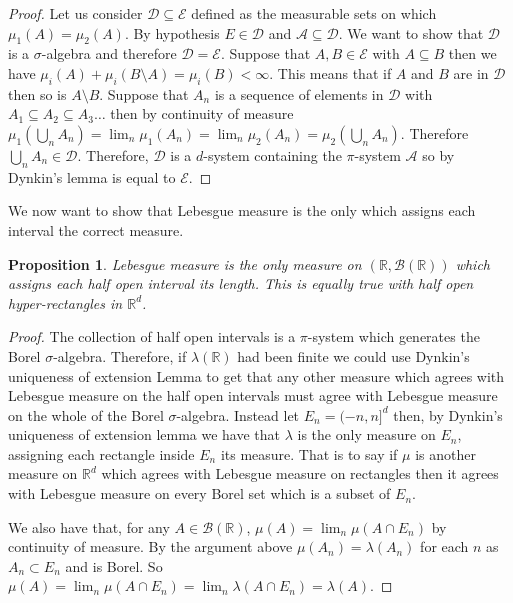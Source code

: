 \documentclass[
]{book}
\newtheorem{proposition}{Proposition}[chapter]
\theoremstyle{definition}
\theoremstyle{definition}
\theoremstyle{definition}
\theoremstyle{definition}
\theoremstyle{remark}
\begin{document}
\begin{proof}
Let us consider \(\mathcal{D} \subseteq \mathcal{E}\) defined as the measurable sets on which \(\mu_1(A) = \mu_2(A)\). By hypothesis \(E \in \mathcal{D}\) and \(\mathcal{A} \subseteq \mathcal{D}\). We want to show that \(\mathcal{D}\) is a \(\sigma\)-algebra and therefore \(\mathcal{D} = \mathcal{E}\). Suppose that \(A, B \in \mathcal{E}\) with \(A \subseteq B\) then we have \(\mu_i(A) + \mu_i (B \setminus A) = \mu_i(B) < \infty.\) This means that if \(A\) and \(B\) are in \(\mathcal{D}\) then so is \(A \setminus B\). Suppose that \(A_n\) is a sequence of elements in \(\mathcal{D}\) with \(A_1 \subseteq A_2 \subseteq A_3 \dots\) then by continuity of measure \(\mu_1(\bigcup_n A_n) = \lim_n \mu_1(A_n) = \lim_n \mu_2(A_n) = \mu_2(\bigcup_n A_n)\). Therefore \(\bigcup_n A_n \in \mathcal{D}\). Therefore, \(\mathcal{D}\) is a \(d\)-system containing the \(\pi\)-system \(\mathcal{A}\) so by Dynkin's lemma is equal to \(\mathcal{E}\).
\end{proof}

We now want to show that Lebesgue measure is the only which assigns each interval the correct measure.

\begin{proposition}
Lebesgue measure is the only measure on \((\mathbb{R}, \mathcal{B}(\mathbb{R}))\) which assigns each half open interval its length. This is equally true with half open hyper-rectangles in \(\mathbb{R}^d\).
\end{proposition}

\begin{proof}
The collection of half open intervals is a \(\pi\)-system which generates the Borel \(\sigma\)-algebra. Therefore, if \(\lambda(\mathbb{R})\) had been finite we could use Dynkin's uniqueness of extension Lemma to get that any other measure which agrees with Lebesgue measure on the half open intervals must agree with Lebesgue measure on the whole of the Borel \(\sigma\)-algebra. Instead let \(E_n = (-n,n]^d\) then, by Dynkin's uniqueness of extension lemma we have that \(\lambda\) is the only measure on \(E_n\), assigning each rectangle inside \(E_n\) its measure. That is to say if \(\mu\) is another measure on \(\mathbb{R}^d\) which agrees with Lebesgue measure on rectangles then it agrees with Lebesgue measure on every Borel set which is a subset of \(E_n\).

We also have that, for any \(A \in \mathcal{B}(\mathbb{R})\), \(\mu(A) = \lim_n \mu(A \cap E_n)\) by continuity of measure. By the argument above \(\mu(A_n) = \lambda(A_n)\) for each \(n\) as \(A_n \subset E_n\) and is Borel. So \(\mu(A) = \lim_n \mu(A\cap E_n) = \lim_n \lambda(A \cap E_n) = \lambda(A)\).
\end{proof}
\end{document}
